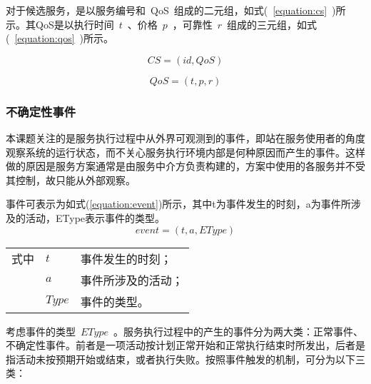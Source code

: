 对于候选服务，是以服务编号和~QoS~组成的二元组，如式(~\ref{equation:cs}~)所示。其QoS是以执行时间~$t$~、价格~$p$~，可靠性~$r$~组成的三元组，如式(~\ref{equation:qos}~)所示。

\begin{equation}\label{equation:cs}
CS = (id, QoS)
\end{equation}

\begin{equation}\label{equation:qos}
QoS = (t, p, r)
\end{equation}

\subsubsection{不确定性事件} \label{uc_event_section}

本课题关注的是服务执行过程中从外界可观测到的事件，即站在服务使用者的角度观察系统的运行状态，而不关心服务执行环境内部是何种原因而产生的事件。这样做的原因是服务方案通常是由服务中介方负责构建的，方案中使用的各服务并不受其控制，故只能从外部观察。

事件可表示为如式(\ref{equation:event})所示，其中t为事件发生的时刻，a为事件所涉及的活动，EType表示事件的类型。
\begin{equation}\label{equation:event}
event = (t, a, EType)
\end{equation}
\begin{tabularx}{\textwidth}{@{}l@{\quad}l@{\pozhehao }X@{}}
    式中
    & $t$ & 事件发生的时刻；\\
    & $a$ & 事件所涉及的活动；\\
    & $Type$ &事件的类型。
\end{tabularx}\vspace{\wordsep}

考虑事件的类型~$EType$~。服务执行过程中的产生的事件分为两大类：正常事件、不确定性事件。前者是一项活动按计划正常开始和正常执行结束时所发出，后者是指活动未按预期开始或结束，或者执行失败。按照事件触发的机制，可分为以下三类：

